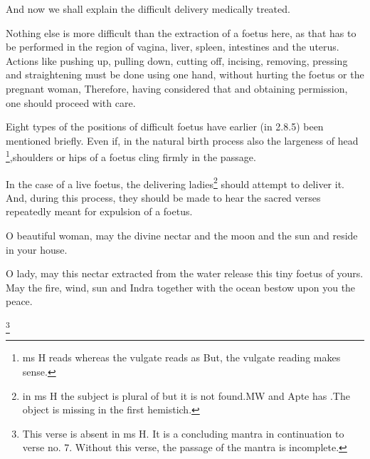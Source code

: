 \begin{translation}
    


    \item [1]  And now we shall explain the difficult delivery medically treated.
    
    \item [3]   Nothing else is more difficult than the extraction of a
foetus here, as that has to be performed in the region of vagina, liver,
spleen, intestines and the uterus.  Actions like pushing up, pulling
down, cutting off, incising, removing, pressing and straightening
must be done using one hand, without hurting the foetus or the
pregnant woman, Therefore, having considered that and obtaining
permission, one should proceed with care.
    
    \item [4]  Eight types of the positions of difficult
foetus have earlier (in 2.8.5) been mentioned briefly. Even if, in the natural birth process
also the largeness of head \footnote{ ms H reads  whereas the vulgate reads as  But, the vulgate reading makes sense.},shoulders or hips of a foetus cling firmly in the passage.
    
  
    \item [5]  In the case of a live foetus, the delivering ladies\footnote{in ms H the subject  is plural of  but it is not found.MW and Apte has .The object is missing in the first hemistich.} should
attempt to deliver it. And, during this process, they should be made
to hear the sacred verses repeatedly meant for expulsion of a foetus.
  \begin{sloka}
        
    \item [6]  O beautiful woman, may the divine nectar and the moon
and the sun and reside in your house.
 
    
    \item [7]  O lady, may this nectar extracted from the water release
this tiny foetus of yours. May the fire, wind, sun and Indra together
with the ocean bestow upon you the peace.

  \end{sloka}

\item [8] \footnote{This verse is absent in ms H. It is a concluding mantra in continuation to verse no. 7. Without this verse, the passage of the mantra is incomplete.}



\end{translation}
